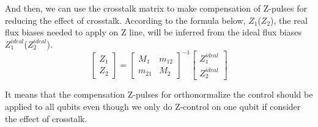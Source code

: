 And then, we can use the crosstalk matrix to make compensation of Z-pulses for reducing the effect of crosstalk.
According to the formula below, $Z_1  $($Z_2 $), the real flux biases needed to apply on Z line, will be inferred from the ideal flux biases $Z_1^{ideal}  $($Z_2^{ideal}  $).
\[\begin{bmatrix} Z_1 \\ Z_2\end{bmatrix}=
{\begin{bmatrix} M_1 & m_{12} \\ m_{21}  & M_2 \end{bmatrix}}^{-1}
\begin{bmatrix} Z_1^{ideal} \\ Z_2^{ideal} \end{bmatrix}\]

It means that the compensation Z-pulses for orthonormalize the control should be applied to all qubits even though we 
only do Z-control on one qubit if consider the effect of crosstalk.